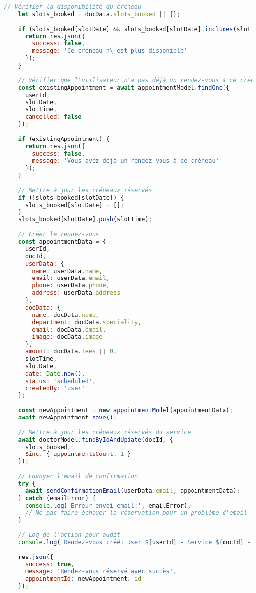 \begin{lstlisting}[language=JavaScript, caption=appointmentController.js - Gestion complète des rendez-vous]
    // Vérifier la disponibilité du créneau
    let slots_booked = docData.slots_booked || {};
    
    if (slots_booked[slotDate] && slots_booked[slotDate].includes(slotTime)) {
      return res.json({
        success: false,
        message: 'Ce créneau n\'est plus disponible'
      });
    }
    
    // Vérifier que l'utilisateur n'a pas déjà un rendez-vous à ce créneau
    const existingAppointment = await appointmentModel.findOne({
      userId,
      slotDate,
      slotTime,
      cancelled: false
    });
    
    if (existingAppointment) {
      return res.json({
        success: false,
        message: 'Vous avez déjà un rendez-vous à ce créneau'
      });
    }
    
    // Mettre à jour les créneaux réservés
    if (!slots_booked[slotDate]) {
      slots_booked[slotDate] = [];
    }
    slots_booked[slotDate].push(slotTime);
    
    // Créer le rendez-vous
    const appointmentData = {
      userId,
      docId,
      userData: {
        name: userData.name,
        email: userData.email,
        phone: userData.phone,
        address: userData.address
      },
      docData: {
        name: docData.name,
        department: docData.speciality,
        email: docData.email,
        image: docData.image
      },
      amount: docData.fees || 0,
      slotTime,
      slotDate,
      date: Date.now(),
      status: 'scheduled',
      createdBy: 'user'
    };
    
    const newAppointment = new appointmentModel(appointmentData);
    await newAppointment.save();
    
    // Mettre à jour les créneaux réservés du service
    await doctorModel.findByIdAndUpdate(docId, { 
      slots_booked,
      $inc: { appointmentsCount: 1 }
    });
    
    // Envoyer l'email de confirmation
    try {
      await sendConfirmationEmail(userData.email, appointmentData);
    } catch (emailError) {
      console.log('Erreur envoi email:', emailError);
      // Ne pas faire échouer la réservation pour un problème d'email
    }
    
    // Log de l'action pour audit
    console.log(`Rendez-vous créé: User ${userId} - Service ${docId} - Date ${slotDate} ${slotTime}`);
    
    res.json({
      success: true,
      message: 'Rendez-vous réservé avec succès',
      appointmentId: newAppointment._id
    });
    

\end{lstlisting}
